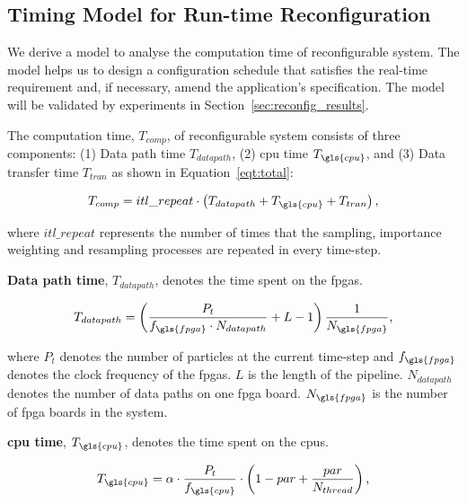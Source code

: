 \subsection{Timing Model for Run-time Reconfiguration}
\label{sec:reconfig_reconfig}

We derive a model to analyse the computation time of reconfigurable system.
The model helps us to design a configuration schedule that satisfies the real-time requirement and, if necessary, amend the application's specification.
The model will be validated by experiments in Section~\ref{sec:reconfig_results}.

The computation time, $T_{comp}$, of reconfigurable system consists of three components: (1) Data path time $T_{datapath}$, (2) \gls{cpu} time $T_{\gls{cpu}}$, and (3) Data transfer time $T_{tran}$ as shown in Equation~\ref{eqt:total}:

\begin{equation}
\begin{aligned}
T_{comp} = itl\_repeat \cdot \left ( T_{datapath} + T_{\gls{cpu}} + T_{tran} \right ) \mbox{,}
\end{aligned}
\label{eqt:total}
\end{equation}

where $itl\_repeat$ represents the number of times that the sampling, importance weighting and resampling processes are repeated in every time-step.

\textbf{Data path time}, $T_{datapath}$, denotes the time spent on the \glspl{fpga}.

\begin{equation}
\begin{aligned}
T_{datapath} = \left(\frac{P_t}{f_{\gls{fpga}} \cdot N_{datapath}} + L - 1 \right) \frac{1}{N_{\gls{fpga}}} \mbox{,}
\end{aligned}
\label{eqt:kernel}
\end{equation}

where $P_t$ denotes the number of particles at the current time-step and $f_{\gls{fpga}}$ denotes the clock frequency of the \glspl{fpga}.
$L$ is the length of the pipeline.
$N_{datapath}$ denotes the number of data paths on one \gls{fpga} board.
$N_{\gls{fpga}}$ is the number of \gls{fpga} boards in the system.

\textbf{\gls{cpu} time}, $T_{\gls{cpu}}$, denotes the time spent on the \glspl{cpu}.

\begin{equation}
\begin{aligned}
T_{\gls{cpu}} = \alpha \cdot \frac{P_t}{f_{\gls{cpu}}} \cdot \left(1-par+\frac{par}{N_{thread}}\right) \mbox{,}
\end{aligned}
\label{eqt:host}
\end{equation}

